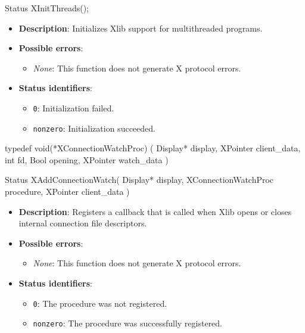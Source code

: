 \documentclass{report}
\begin{document}
\begin{itemize}
        \begin{cppcode}
            Status XInitThreads();
        \end{cppcode}
        \begin{itemize}
            \item \textbf{Description}: Initializes Xlib support for multithreaded programs.
            \item \textbf{Possible errors}:
                \begin{itemize}
                    \item \textit{None}: This function does not generate X protocol errors.
                \end{itemize}
            \item \textbf{Status identifiers}:
                \begin{itemize}
                    \item \texttt{0}: Initialization failed.
                    \item \texttt{nonzero}: Initialization succeeded.
                \end{itemize}
        \end{itemize}

        \begin{cppcode}
            typedef void(*XConnectionWatchProc) (
                Display* display,
                XPointer client_data,
                int fd,
                Bool opening,
                XPointer watch_data
            )

            Status XAddConnectionWatch(
                Display* display,
                XConnectionWatchProc procedure,
                XPointer client_data
            )
        \end{cppcode}
        \begin{itemize}
            \item \textbf{Description}: Registers a callback that is called when Xlib opens or closes internal connection file descriptors.
            \item \textbf{Possible errors}:
                \begin{itemize}
                    \item \textit{None}: This function does not generate X protocol errors.
                \end{itemize}
            \item \textbf{Status identifiers}:
                \begin{itemize}
                    \item \texttt{0}: The procedure was not registered.
                    \item \texttt{nonzero}: The procedure was successfully registered.
                \end{itemize}
        \end{itemize}


\end{itemize}
\end{document}
